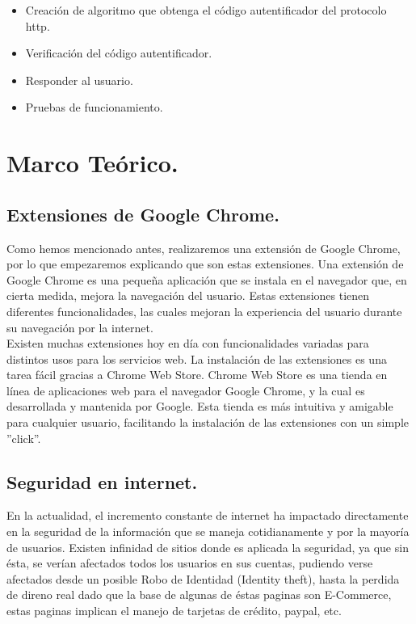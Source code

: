 \documentclass[12pt, a4paper, titlepage]{article}
\begin{document}
\begin{enumerate}
\begin{itemize}
                \begin{itemize}
                    \item Creación de algoritmo que obtenga el código autentificador del protocolo \acrshort{http}.
                    \item Verificación del código autentificador.
                    \item Responder al usuario.
                    \item Pruebas de funcionamiento.
                \end{itemize}
            \end{itemize}
        \end{enumerate}
	\newpage
	\section{\textcolor{azulescom}{Marco Teórico.}}
	
	    \subsection{Extensiones de Google Chrome.}
		Como hemos mencionado antes, realizaremos una extensión de Google Chrome, por lo que empezaremos  explicando que son estas extensiones. Una extensión de Google Chrome es una pequeña aplicación que se instala en el navegador que, en cierta medida, mejora la navegación del usuario. Estas extensiones tienen diferentes funcionalidades, las cuales mejoran la experiencia del usuario durante su navegación por la internet.\\
		Existen muchas extensiones hoy en día con funcionalidades variadas para distintos usos para los servicios web. La instalación de las extensiones es una tarea fácil gracias a Chrome Web Store. Chrome Web Store es una tienda en línea de aplicaciones web para el navegador Google Chrome, y la cual es desarrollada y mantenida por Google. Esta tienda es más intuitiva y amigable para cualquier usuario, facilitando la instalación de las extensiones con un simple ''click''.\\
		
		\subsection{Seguridad en internet.}
		En la actualidad, el incremento constante de internet ha impactado directamente en la seguridad de la información que se maneja cotidianamente y por la mayoría de usuarios. Existen infinidad de sitios donde es aplicada la seguridad, ya que sin ésta, se verían afectados todos los usuarios en sus cuentas, pudiendo verse afectados desde un posible \Gls{Robo de Identidad} (Identity theft), hasta la perdida de direno real dado que la base de algunas de éstas paginas son E-Commerce, estas paginas implican el manejo de tarjetas de crédito, paypal, etc.\\
		
\end{document}
